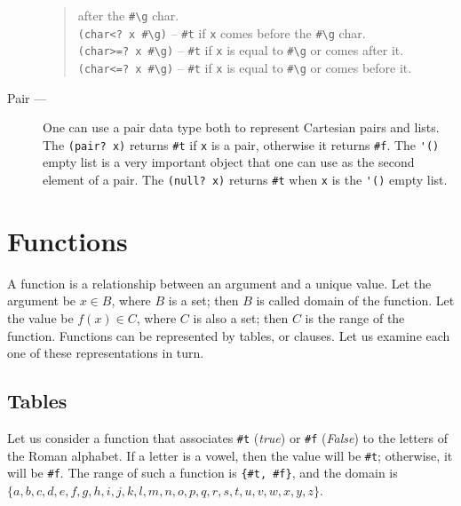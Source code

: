 \documentclass[a4paper,12pt]{book}
\begin{document}
\begin{description}
\begin{quote}
after the \verb|#\g| char.\\
\verb|(char<? x #\g)| -- \verb|#t| if \verb|x| comes
before the \verb|#\g| char.\\
\verb|(char>=? x #\g)| -- \verb|#t| if \verb|x| is
equal to \verb|#\g| or comes after it.\\
\verb|(char<=? x #\g)| -- \verb|#t| if \verb|x| is
equal to \verb|#\g| or comes before it.\\
\end{quote}
\item[Pair ---] One can use a pair data type
both to represent Cartesian pairs and lists.
The \verb|(pair? x)| returns \verb|#t| if
\verb|x| is a pair,
otherwise it returns \verb|#f|.
The \verb|'()| empty list is a very important
object that one can use as the second element
of a pair. The \verb|(null? x)| returns \verb|#t|
when \verb|x| is the \verb|'()| empty list.
\end{description}


\section{Functions}
A function is a relationship between an argument and a unique value.
Let the argument be $x\in B$, where $B$ is a set; then $B$ is called
domain of the function. Let the value be $f(x)\in C$, where $C$ is
also a set; then $C$ is the range of the function.
Functions can be represented by tables, or clauses. Let us examine
each one of these representations in turn.

\subsection*{Tables}
Let us consider a function that associates \verb|#t| ({\em true})
or \verb|#f| ({\em False}) to the
letters of the Roman alphabet. If a letter is a vowel,
then the value will be \verb|#t|; otherwise, 
it will be \verb|#f|. The range of such a function
is \verb|{#t, #f}|, and the domain is
$\{a,b,c,d,e,f,g,h,i,j,k,l,m,n,o,p,q,r,s,t,u,v,w,x,y,z\}$.\\
\end{document}
